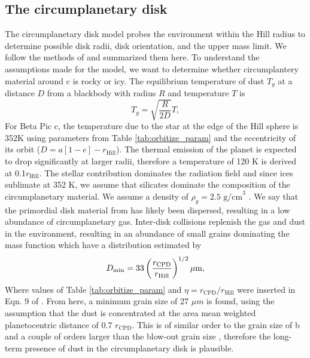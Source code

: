 \subsection{The circumplanetary disk}\label{sec:method_CPD}
The circumplanetary disk model probes the environment within the Hill radius to determine possible disk radii, disk orientation, and the upper mass limit.
%
We follow the methods of \cite{Kenworthy_2021} and summarized them here.
%
To understand the assumptions made for the model, we want to determine whether circumplantery material around \pic c is rocky or icy. 
%
The equilibrium temperature of dust $T_g$ at a distance $D$ from a blackbody with radius $R$ and temperature $T$ is 
\begin{equation}
    T_g = \sqrt{\frac{R}{2D}}T,
\end{equation}
%
For Beta Pic c, the temperature due to the star at the edge of the Hill sphere is 352K using parameters from Table \ref{tab:orbitize_param} and the eccentricity of its orbit ($D = a[1-e]-r_{\text{Hill}}$).  
%
The thermal emission of the planet is expected to drop significantly at larger radii, therefore a temperature of 120 K is derived at 0.1$r_{\text{Hill}}$.
%
The stellar contribution dominates the radiation field and since ices sublimate at 352 K, we assume that silicates dominate the composition of the circumplanetary material.
%
We assume a density of $\rho_g =\text{2.5 g/cm}^3$ \citep{Chen_2001,Li_1997}.  
%
We say that the primordial disk material from \pic has likely been dispersed, resulting in a low abundance of circumplanetary gas.  
%
Inter-disk collisions replenish the gas and dust in the environment, resulting in an abundance of small grains dominating the mass function \citep{Kennedy_2011,Dohnanyi_1969} which have a distribution estimated by 
%
\begin{equation}
    D_{\text{min}} = 33 \left(\frac{r_{\text{\text{CPD}}}}{r_{\text{Hill}}}\right)^{1/2}  \mu \text{m},
    \label{eq:Mass}
\end{equation}
Where values of Table \ref{tab:orbitize_param} and $\eta = r_{\text{CPD}}/r_{\text{Hill}}$ were inserted in Eqn. 9 of \citet{Kennedy_2011}.
%
From here, a minimum grain size of 27 $\mu m$ is found, using the assumption that the dust is concentrated at the area mean weighted planetocentric distance of 0.7 $r_{\text{CPD}}$.
%
This is of similar order to the grain size of \pic b and a couple of orders larger than the blow-out grain size \citep{Kenworthy_2021}, therefore the long-term presence of dust in the circumplanetary disk is plausible. 

